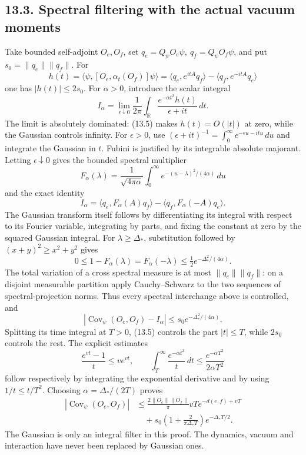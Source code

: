 \documentclass[
]{article}
\begin{document}
\subsection{13.3. Spectral filtering with the actual vacuum
moments}\label{spectral-filtering-with-the-actual-vacuum-moments}

Take bounded self-adjoint \(O_e,O_f\), set
\(q_e=Q_\psi O_e\psi,\ q_f=Q_\psi O_f\psi\), and put
\(s_0=\|q_e\|\|q_f\|\). For \[
h(t)=\langle\psi,[O_e,\alpha_t(O_f)]\psi\rangle
=\langle q_e,e^{itA}q_f\rangle-\langle q_f,e^{-itA}q_e\rangle
\] one has \(|h(t)|\le2s_0\). For \(\alpha>0\), introduce the scalar
integral \[
I_\alpha=\lim_{\epsilon\downarrow0}\frac1{2\pi}
 \int_{\mathbb R}\frac{e^{-\alpha t^2}h(t)}{\epsilon+it}\,dt.
\] The limit is absolutely dominated: (13.5) makes \(h(t)=O(|t|)\) at
zero, while the Gaussian controls infinity. For \(\epsilon>0\), use
\((\epsilon+it)^{-1}=\int_0^\infty e^{-\epsilon u-itu}\,du\) and
integrate the Gaussian in \(t\). Fubini is justified by its integrable
absolute majorant. Letting \(\epsilon\downarrow0\) gives the bounded
spectral multiplier \[
F_\alpha(\lambda)=\frac1{\sqrt{4\pi\alpha}}
 \int_0^\infty e^{-(u-\lambda)^2/(4\alpha)}\,du
\] and the exact identity \[
I_\alpha=\langle q_e,F_\alpha(A)q_f\rangle
          -\langle q_f,F_\alpha(-A)q_e\rangle.
\] The Gaussian transform itself follows by differentiating its integral
with respect to its Fourier variable, integrating by parts, and fixing
the constant at zero by the squared Gaussian integral. For
\(\lambda\ge\Delta_*\), substitution followed by \((x+y)^2\ge x^2+y^2\)
gives \[
0\le1-F_\alpha(\lambda)=F_\alpha(-\lambda)
\le\tfrac12e^{-\Delta_*^2/(4\alpha)}.
\] The total variation of a cross spectral measure is at most
\(\|q_e\|\|q_f\|\): on a disjoint measurable partition apply
Cauchy--Schwarz to the two sequences of spectral-projection norms. Thus
every spectral interchange above is controlled, and \[
|\operatorname{Cov}_\psi(O_e,O_f)-I_\alpha|
\le s_0e^{-\Delta_*^2/(4\alpha)}.
\] Splitting its time integral at \(T>0\), (13.5) controls the part
\(|t|\le T\), while \(2s_0\) controls the rest. The explicit estimates
\[
\frac{e^{vt}-1}{t}\le ve^{vt},\qquad
\int_T^\infty\frac{e^{-\alpha t^2}}t\,dt
\le\frac{e^{-\alpha T^2}}{2\alpha T^2}
\] follow respectively by integrating the exponential derivative and by
using \(1/t\le t/T^2\). Choosing \(\alpha=\Delta_*/(2T)\) proves \[
\begin{split}
|\operatorname{Cov}_\psi(O_e,O_f)|
&\le\frac{2\|O_e\|\|O_f\|}{\pi}
        vT e^{-d(e,f)+vT}\\
&\quad+s_0\left(1+\frac2{\pi\Delta_*T}\right)
        e^{-\Delta_*T/2}.
\end{split}                                                   \tag{13.7}
\] The Gaussian is only an integral filter in this proof. The dynamics,
vacuum and interaction have never been replaced by Gaussian ones.
\end{document}
